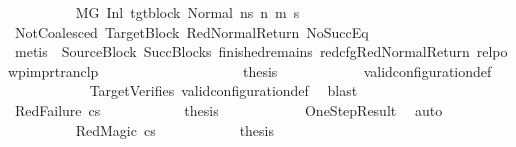 \begin{isabellebody}
\ \ \ \ \ \ \ \ \isamarkupfalse%
\ {\isachardoublequoteopen}M{\isacharcomma}{\kern0pt}{\isasymLambda}{\isacharcomma}{\kern0pt}{\isasymGamma}{\isacharcomma}{\kern0pt}{\isasymOmega}{\isacharcomma}{\kern0pt}G{\isacharprime}{\kern0pt}\ {\isasymturnstile}{\isacharparenleft}{\kern0pt}Inl\ tgt{\isacharunderscore}{\kern0pt}block{\isacharcomma}{\kern0pt}\ Normal\ ns{\isacharparenright}{\kern0pt}\ {\isacharminus}{\kern0pt}n{\isasymrightarrow}\ {\isacharparenleft}{\kern0pt}m{\isacharprime}{\kern0pt}{\isacharcomma}{\kern0pt}\ s{\isacharprime}{\kern0pt}{\isacharparenright}{\kern0pt}{\isachardoublequoteclose}\isanewline
\ \ \ \ \ \ \ \ \ \ \isamarkupfalse%
\ NotCoalesced\ TargetBlock\ RedNormalReturn\ NoSuccEq\isanewline
\ \ \ \ \ \ \ \ \ \ \isamarkupfalse%
\ {\isacharparenleft}{\kern0pt}metis\ {\isachardoublequoteopen}{}{\isachardoublequoteclose}{\isacharparenleft}{\kern0pt}{}{\isacharparenright}{\kern0pt}\ SourceBlock\ SuccBlocks\ finished{\isacharunderscore}{\kern0pt}remains\ red{\isacharunderscore}{\kern0pt}cfg{\isachardot}{\kern0pt}RedNormalReturn\ relpowp{\isacharunderscore}{\kern0pt}imp{\isacharunderscore}{\kern0pt}rtranclp{\isacharparenright}{\kern0pt}\isanewline
\ \ \ \ \ \ \ \ \isanewline
\ \ \ \ \ \ \ \ \isamarkupfalse%
\ \isamarkupfalse%
\ {\isacharquery}{\kern0pt}thesis\isanewline
\ \ \ \ \ \ \ \ \ \ \isamarkupfalse%
\ valid{\isacharunderscore}{\kern0pt}configuration{\isacharunderscore}{\kern0pt}def\isanewline
\ \ \ \ \ \ \ \ \ \ \isamarkupfalse%
\ TargetVerifies\ valid{\isacharunderscore}{\kern0pt}configuration{\isacharunderscore}{\kern0pt}def\ \isamarkupfalse%
\ blast\isanewline
\ \ \ \ \ \ \isamarkupfalse%
\isanewline
\ \ \ \ \ \ \ \ \isamarkupfalse%
\ {\isacharparenleft}{\kern0pt}RedFailure\ cs{\isacharparenright}{\kern0pt}\isanewline
\ \ \ \ \ \ \ \ \isamarkupfalse%
\ \isamarkupfalse%
\ {\isacharquery}{\kern0pt}thesis\isanewline
\ \ \ \ \ \ \ \ \ \ \isamarkupfalse%
\ OneStepResult\ \isamarkupfalse%
\ auto\isanewline
\ \ \ \ \ \ \isamarkupfalse%
\isanewline
\ \ \ \ \ \ \ \ \isamarkupfalse%
\ {\isacharparenleft}{\kern0pt}RedMagic\ cs{\isacharparenright}{\kern0pt}\isanewline
\ \ \ \ \ \ \ \ \isamarkupfalse%
\ \isamarkupfalse%
\ {\isacharquery}{\kern0pt}thesis\isanewline

\end{isabellebody}
